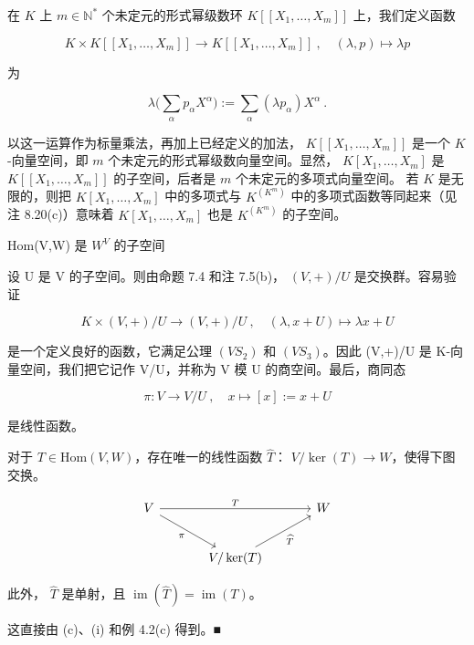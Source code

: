 \begin{example}
\begin{items}
\item

在  $ K $ 上  $ m \in \mathbb{N}^* $ 个未定元的形式幂级数环  $ K[[X_1, \ldots, X_m]] $ 上，我们定义函数

\[
K\times K[[X_{1},\ldots,X_{m}]]\to K[[X_{1},\ldots,X_{m}]]~,\quad(\lambda,p)\mapsto\lambda p
\]

为

\[
\lambda\Big(\sum_{\alpha}p_{\alpha}X^{\alpha}\Big):=\sum_{\alpha}(\lambda p_{\alpha})X^{\alpha}~.
\]

以这一运算作为标量乘法，再加上已经定义的加法， $ K[[X_1, \ldots, X_m]] $ 是一个  $ K $-向量空间，即  $ m $ 个未定元的形式幂级数向量空间。显然， $ K[X_1, \ldots, X_m] $ 是  $ K[[X_1, \ldots, X_m]] $ 的子空间，后者是  $ m $ 个未定元的多项式向量空间。
若 $K$ 是无限的，则把 $K[X_{1},\ldots,X_{m}]$ 中的多项式与 $K^{(K^{m})}$ 中的多项式函数等同起来（见注 8.20(c)）意味着 $K[X_{1},\ldots,X_{m}]$ 也是 $K^{(K^{m})}$ 的子空间。

\item

Hom(V,W) 是  $ W^{V} $ 的子空间

\item

设 U 是 V 的子空间。则由命题 7.4 和注 7.5(b)， $ (V,+)/U $ 是交换群。容易验证

\[
K\times(V,+)/U\to(V,+)/U~,\quad(\lambda,x+U)\mapsto\lambda x+U
\]

是一个定义良好的函数，它满足公理 $ (VS_{2}) $ 和 $ (VS_{3}) $。因此 (V,+)/U 是 K-向量空间，我们把它记作 V/U，并称为 V 模 U 的商空间。最后，商同态

\[
\pi:V\to V/U~,\quad x\mapsto[x]:=x+U
\]

是线性函数。

\item

对于  $ T \in \text{Hom}(V, W) $，存在唯一的线性函数  $ \widehat{T} $： $ V/\ker(T) \to W $，使得下图交换。

\[
\begin{tikzcd}[row sep=2.4em, column sep=3.4em]
 V \arrow[rr, "T"] \arrow[rd, "\pi"'] & & W \\
 & V/\ker(T) \arrow[ru, "\widehat{T}"']
 \end{tikzcd}
\]

此外， $ \widehat{T} $ 是单射，且 $ \operatorname{im}(\widehat{T}) = \operatorname{im}(T) $。

\proofhead
这直接由 (c)、(i) 和例 4.2(c) 得到。■
\item


\end{items}
\end{example}

